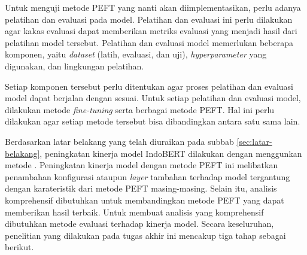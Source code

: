 Untuk menguji metode PEFT yang nanti akan diimplementasikan, perlu adanya pelatihan dan evaluasi pada model. Pelatihan dan evaluasi ini perlu dilakukan agar kakas evaluasi dapat memberikan metriks evaluasi yang menjadi hasil dari pelatihan model tersebut. Pelatihan dan evaluasi model memerlukan beberapa komponen, yaitu \textit{dataset} (latih, evaluasi, dan uji), \textit{hyperparameter} yang digunakan, dan lingkungan pelatihan.

Setiap komponen tersebut perlu ditentukan agar proses pelatihan dan evaluasi model dapat berjalan dengan sesuai. Untuk setiap pelatihan dan evaluasi model, dilakukan metode \textit{fine-tuning} serta berbagai metode PEFT. Hal ini perlu dilakukan agar setiap metode tersebut bisa dibandingkan antara satu sama lain.


Berdasarkan latar belakang yang telah diuraikan pada subbab \ref{sec:latar-belakang}, peningkatan kinerja model IndoBERT dilakukan dengan menggunkan metode \PEFT. Peningkatan kinerja model dengan metode PEFT ini melibatkan penambahan konfigurasi ataupun \textit{layer} tambahan terhadap model tergantung dengan karateristik dari metode PEFT masing-masing. Selain itu, analisis komprehensif dibutuhkan untuk membandingkan metode PEFT yang dapat memberikan hasil terbaik. Untuk membuat analisis yang komprehensif dibutuhkan metode evaluasi terhadap kinerja model. Secara keseluruhan, penelitian yang dilakukan pada tugas akhir ini mencakup tiga tahap sebagai berikut.

